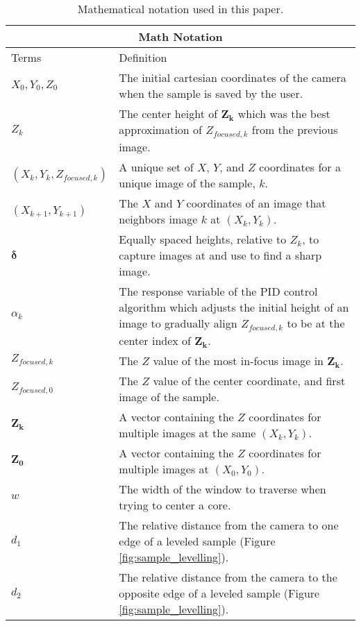 \begin{table}[h]
    \centering
    \caption{Mathematical notation used in this paper.}
    \label{tab:math_notation}
    \begin{tabular}{ |p{3.5cm}||p{11.5cm}|  }
      \hline
      \multicolumn{2}{|c|}{Math Notation} \\
      \hline
      Terms & Definition\\
      \hline
      $X_0, Y_0, Z_0$   &The initial cartesian coordinates of the camera when the sample is saved by the user. \\
      $Z_k$ & The center height of $\boldsymbol{Z_k}$ which was the best approximation of $Z_{focused,k}$ from the previous image.\\ 
      $(X_k, Y_k, Z_{focused,k})$ & A unique set of $X$, $Y$, and $Z$ coordinates for a unique image of the sample, $k$. \\
      $(X_{k+1}, Y_{k+1})$ & The $X$ and $Y$ coordinates of an image that neighbors image $k$ at $(X_k, Y_k)$. \\
      $\boldsymbol{\delta}$ & Equally spaced heights, relative to $Z_k$, to capture images at and use to find a sharp image. \\
      $\alpha_k$ & The response variable of the PID control algorithm which adjusts the initial height of an image to gradually align $Z_{focused,k}$ to be at the center index of $\boldsymbol{Z_k}$.\\
      $Z_{focused,k}$ & The $Z$ value of the most in-focus image in $\boldsymbol{Z_k}$. \\
      $Z_{focused,0}$ & The $Z$ value of the center coordinate, and first image of the sample. \\
      $\boldsymbol{Z_k}$ & A vector containing the $Z$ coordinates for multiple images at the same $(X_k, Y_k)$. \\
      $\boldsymbol{Z_0}$ & A vector containing the $Z$ coordinates for multiple images at $(X_0, Y_0)$. \\
      $w$ & The width of the window to traverse when trying to center a core. \\
      $d_1$ & The relative distance from the camera to one edge of a leveled sample (Figure \ref{fig:sample_levelling}).\\
      $d_2$ & The relative distance from the camera to the opposite edge of a leveled sample (Figure \ref{fig:sample_levelling}). \\
      \hline
    \end{tabular}
    \end{table}